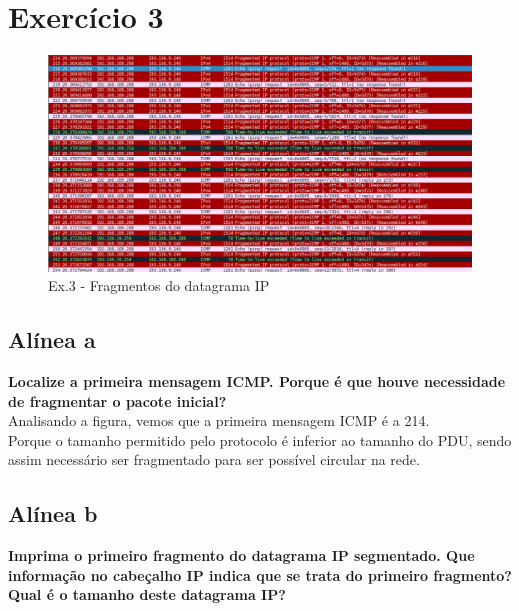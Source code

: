 \documentclass[a4paper]{report}
\begin{document}
\section{Exercício 3}

\begin{figure}[H]
    \centering 
    \includegraphics[width=\textwidth]{images/datagramaIpEx3.png}
    \caption{Ex.3 - Fragmentos do datagrama IP}
    \label{fig:datagramaIpEx3}
\end{figure}
\subsection{Alínea a}
\textbf{Localize a primeira mensagem ICMP. Porque é que houve 
necessidade de fragmentar o pacote inicial?}\\
Analisando a figura, vemos que a primeira mensagem ICMP é a 214.\\
Porque o tamanho permitido pelo protocolo é inferior ao tamanho do PDU, sendo
assim necessário ser fragmentado para ser possível circular na rede.

\subsection{Alínea b}
\textbf{Imprima o primeiro fragmento do datagrama IP segmentado. 
Que informação no cabeçalho IP indica que se trata do primeiro fragmento? 
Qual é o tamanho deste datagrama IP?}
\end{document}

